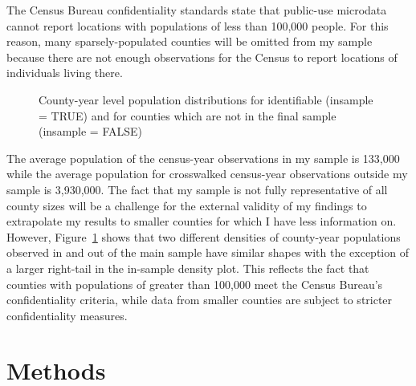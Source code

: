 \documentclass[12pt]{article}
\begin{document}
The Census Bureau confidentiality standards state that public-use
microdata cannot report locations with populations of less
than 100,000 people. For this reason, many sparsely-populated counties
will be omitted from my sample because there are not enough observations
for the Census to report locations of individuals living there.


\label{cell-fig-comparesamplepops}
\begin{figure}[H]
\caption{\label{fig-comparesamplepops}County-year level population
distributions for identifiable (insample = TRUE) and for counties which are not in the final sample (insample = FALSE)}
\end{figure}%

The average population of the census-year observations in my sample is
133,000 while the average population for
crosswalked census-year observations outside my sample is
3,930,000. The fact that my sample is not
fully representative of all county sizes will be a challenge for the
external validity of my findings to extrapolate my results to smaller
counties for which I have less information on. However,
Figure~\ref{fig-comparesamplepops} shows that two different densities of
county-year populations observed in and out of the main sample have
similar shapes with the exception of a larger right-tail in the
in-sample density plot. This reflects the fact that counties with
populations of greater than 100,000 meet the Census Bureau's
confidentiality criteria, while data from smaller counties are subject
to stricter confidentiality measures.

\section{Methods}\label{methods}
\end{document}
